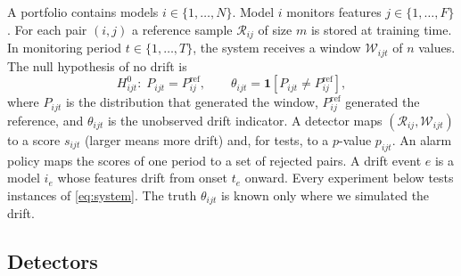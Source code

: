 \documentclass[journal]{IEEEtran}
\begin{document}
A portfolio contains models $i\in\{1,\dots,N\}$. Model $i$ monitors features $j\in\{1,\dots,F\}$. For each pair $(i,j)$ a reference sample $\mathcal{R}_{ij}$ of size $m$ is stored at training time. In monitoring period $t\in\{1,\dots,T\}$, the system receives a window $\mathcal{W}_{ijt}$ of $n$ values. The null hypothesis of no drift is
\begin{equation}
H^{0}_{ijt}:\; P_{ijt} = P^{\mathrm{ref}}_{ij}, \qquad \theta_{ijt} = \mathbf{1}\!\left[P_{ijt}\neq P^{\mathrm{ref}}_{ij}\right],
\label{eq:system}
\end{equation}
where $P_{ijt}$ is the distribution that generated the window, $P^{\mathrm{ref}}_{ij}$ generated the reference, and $\theta_{ijt}$ is the unobserved drift indicator. A detector maps $(\mathcal{R}_{ij},\mathcal{W}_{ijt})$ to a score $s_{ijt}$ (larger means more drift) and, for tests, to a $p$-value $p_{ijt}$. An alarm policy maps the scores of one period to a set of rejected pairs. A drift event $e$ is a model $i_e$ whose features drift from onset $t_e$ onward. Every experiment below tests instances of \eqref{eq:system}. The truth $\theta_{ijt}$ is known only where we simulated the drift.

\subsection{Detectors}
\end{document}
